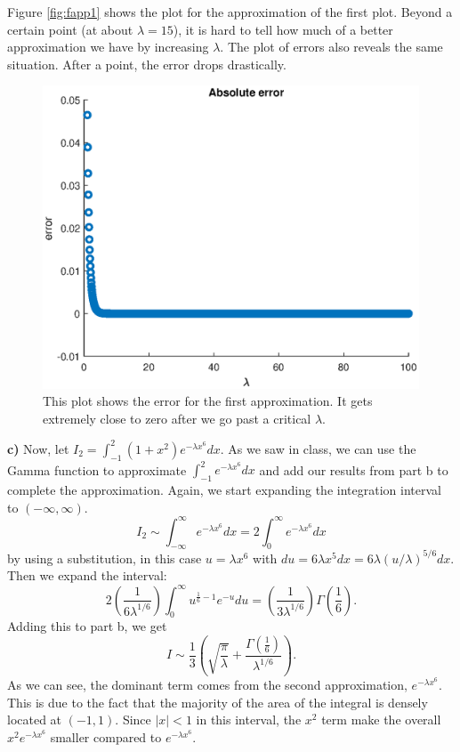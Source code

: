 \documentclass[12pt,letterpaper]{article}
\begin{document}
Figure \ref{fig:fapp1} shows the plot for the approximation of the first plot. Beyond a certain point (at about $\lambda = 15$), it is hard to tell how much of a better approximation we have by increasing $\lambda$. The plot of errors also reveals the same situation. After a point, the error drops drastically.
\begin{figure}[h]
    \centering
    \includegraphics[height=9cm]{problem4/hw3_3_berror.eps}
    \caption{This plot shows the error for the first approximation. It gets extremely close to zero after we go past a critical $\lambda$. }
    \label{fig:ferror1}
\end{figure}
\vspace{1cm}
\newline \textbf{c)} Now, let $I_2 = \int_{-1}^2 (1+x^2) e^{-\lambda x^6} dx$. As we saw in class, we can use the Gamma function to approximate $\int_{-1}^2 e^{-\lambda x^6} dx$ and add our results from part b to complete the approximation. 
\newline Again, we start expanding the integration interval to  $(-\infty,\infty )$.
\begin{equation}
    I_2 \sim \int_{-\infty}^\infty e^{-\lambda x^6} dx = 2 \int_{0}^\infty e^{-\lambda x^6} dx 
\end{equation}
by using a substitution, in this case $u = \lambda x^6$ with $du = 6 \lambda x^5 dx = 6 \lambda (u/\lambda)^{5/6} dx$. Then we expand the interval:
\begin{equation}
   2 (\frac{1}{6 \lambda^{1/6}}) \int^\infty_{0} u^{\frac{1}{6}-1} {e^{- u}} du = (\frac{1}{3 \lambda^{1/6}}) \Gamma (\frac{1}{6}).
\end{equation}
Adding this to part b, we get
\begin{equation}
  I \sim \frac{1}{3} \left( \sqrt{\frac{\pi}{{\lambda}}} + \frac{\Gamma (\frac{1}{6})}{\lambda^{1/6}} \right).
\end{equation}
As we can see, the dominant term comes from the second approximation, $e^{-\lambda x^6}$. This is due to the fact that the majority of the area of the integral is densely located at $(-1,1)$. Since $|x|<1$ in this interval, the $x^2$ term make the overall $x^2 e^{-\lambda x^6}$ smaller compared to $ e^{-\lambda x^6}$.
\end{document}
